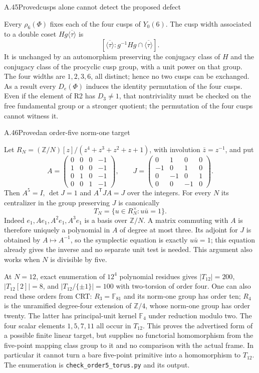 \begin{statement}{A.45}{Proved}{cusps alone cannot detect the proposed defect}
\end{statement}
Every $\rho_6(\Phi)$ fixes each of the four cusps of $Y_0(6)$.
The cusp width associated to a double coset
$H g\overline{\langle\tau\rangle}$ is
\[
 [\overline{\langle\tau\rangle}:
  g^{-1}Hg\cap\overline{\langle\tau\rangle}].
\]
It is unchanged by an automorphism preserving the conjugacy class of $H$
and the conjugacy class of the procyclic cusp group, with a unit power on
that group. The four widths are $1,2,3,6$, all distinct; hence no two
cusps can be exchanged. As a result every $D_e(\Phi)$ induces the identity
permutation of the four cusps. Even if the element of R2 has
$D_3\ne1$, that nontriviality must be checked on the free fundamental
group or a stronger quotient; the permutation of the four cusps cannot
witness it.

\begin{statement}{A.46}{Proved}{an order-five norm-one target}
\end{statement}
Let $R_N=(\mathbb Z/N)[z]/(z^4+z^3+z^2+z+1)$, with involution
$\bar z=z^{-1}$, and put
\[
 A=\begin{pmatrix}0&0&0&-1\\1&0&0&-1\\0&1&0&-1\\0&0&1&-1\end{pmatrix},
 \qquad
 J=\begin{pmatrix}0&1&0&0\\-1&0&1&0\\0&-1&0&1\\0&0&-1&0\end{pmatrix}.
\]
Then $A^5=I$, $\det J=1$ and $A^{\mathsf T}JA=J$ over the integers.
For every $N$ its centralizer in the group preserving $J$ is canonically
\[
 T_N=\{u\in R_N^{\times}:u\bar u=1\}.
\]
Indeed $e_1,Ae_1,A^2e_1,A^3e_1$ is a basis over $\mathbb Z/N$.
A matrix commuting with $A$ is therefore uniquely a polynomial in $A$ of
degree at most three. Its adjoint for $J$ is obtained by
$A\mapsto A^{-1}$, so the symplectic equation is exactly $u\bar u=1$;
this equation already gives the inverse and no separate unit test is
needed. This argument also works when $N$ is divisible by five.

At $N=12$, exact enumeration of $12^4$ polynomial residues gives
$|T_{12}|=200$, $|T_{12}[2]|=8$, and
$|T_{12}/\{\pm1\}|=100$ with two-torsion of order four. One can also
read these orders from CRT: $R_3=\mathbb F_{81}$ and its norm-one group
has order ten; $R_4$ is the unramified degree-four extension of
$\mathbb Z/4$, whose norm-one group has order twenty. The latter has
principal-unit kernel $\mathbb F_4$ under reduction modulo two.
The four scalar elements $1,5,7,11$ all occur in $T_{12}$.
This proves the advertised form of a possible finite linear target,
but supplies no functorial homomorphism from the five-point mapping class
group to it and no comparison with the actual frame. In particular it
cannot turn a bare five-point primitive into a homomorphism to $T_{12}$.
The enumeration is \texttt{check\_order5\_torus.py} and its output.

